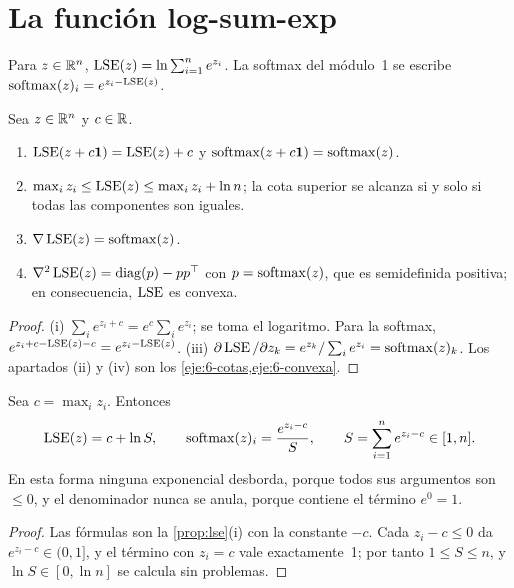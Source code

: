 \section{La función log-sum-exp}

\begin{definicion}\label{def:lse}
Para $z\in\mathbb{R}^{n}$, $\operatorname{LSE}(z)=\ln\sum_{i=1}^{n}e^{z_i}$. La softmax del módulo~1 se escribe $\operatorname{softmax}(z)_i=e^{z_i-\operatorname{LSE}(z)}$.
\end{definicion}

\begin{proposicion}\label{prop:lse}
Sea $z\in\mathbb{R}^{n}$ y $c\in\mathbb{R}$.
\begin{enumerate}
  \item $\operatorname{LSE}(z+c\mathbf{1})=\operatorname{LSE}(z)+c$ y $\operatorname{softmax}(z+c\mathbf{1})=\operatorname{softmax}(z)$.
  \item $\max_iz_i\le\operatorname{LSE}(z)\le\max_iz_i+\ln n$; la cota superior se alcanza si y solo si todas las componentes son iguales.
  \item $\nabla\operatorname{LSE}(z)=\operatorname{softmax}(z)$.
  \item $\nabla^{2}\operatorname{LSE}(z)=\operatorname{diag}(p)-pp^{\top}$ con $p=\operatorname{softmax}(z)$, que es semidefinida positiva; en consecuencia, $\operatorname{LSE}$ es convexa.
\end{enumerate}
\end{proposicion}

\begin{proof}
(i) $\sum_ie^{z_i+c}=e^{c}\sum_ie^{z_i}$; se toma el logaritmo. Para la softmax, $e^{z_i+c-\operatorname{LSE}(z)-c}=e^{z_i-\operatorname{LSE}(z)}$. (iii) $\partial\operatorname{LSE}/\partial z_k=e^{z_k}/\sum_ie^{z_i}=\operatorname{softmax}(z)_k$. Los apartados (ii) y (iv) son los \cref{eje:6-cotas,eje:6-convexa}.
\end{proof}

\begin{proposicion}\label{prop:lse-estable}
Sea $c=\max_iz_i$. Entonces
\[
\operatorname{LSE}(z)=c+\ln S,\qquad \operatorname{softmax}(z)_i=\frac{e^{z_i-c}}{S},\qquad S=\sum_{i=1}^{n}e^{z_i-c}\in[1,n].
\]
En esta forma ninguna exponencial desborda, porque todos sus argumentos son $\le 0$, y el denominador nunca se anula, porque contiene el término $e^{0}=1$.
\end{proposicion}

\begin{proof}
Las fórmulas son la \cref{prop:lse}(i) con la constante $-c$. Cada $z_i-c\le 0$ da $e^{z_i-c}\in(0,1]$, y el término con $z_i=c$ vale exactamente~1; por tanto $1\le S\le n$, y $\ln S\in[0,\ln n]$ se calcula sin problemas.
\end{proof}

